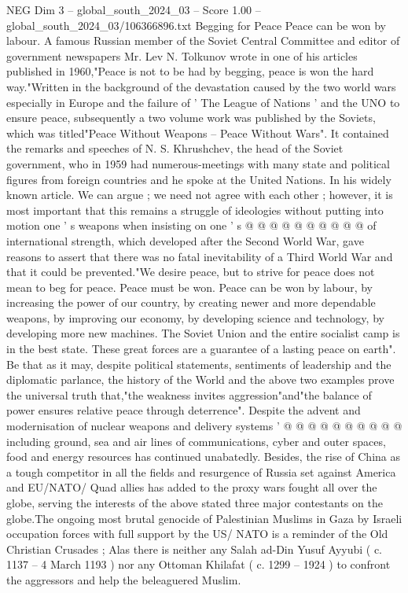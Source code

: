\begin{textsample}{NEG Dim 3 – global\_south\_2024\_03 – Score 1.00 – global\_south\_2024\_03/106366896.txt}  \label{ex:f3_neg_037}
Begging for Peace Peace can be won by labour.
A famous Russian member of the Soviet Central Committee and editor of government newspapers Mr.
Lev N.
Tolkunov wrote in one of his articles published in 1960,"Peace is not to be had by begging, peace is won the hard way."Written in the background of the devastation caused by the two world wars especially in Europe and the failure of ' The League of Nations ' and the UNO to ensure peace, subsequently a two volume work was published by the Soviets, which was titled"Peace Without Weapons -- Peace Without Wars".
It contained the remarks and speeches of N.
S.
Khrushchev, the head of the Soviet government, who in 1959 had numerous-meetings with many state and political figures from foreign countries and he spoke at the United Nations.
In his widely known article.
We can argue ; we need not agree with each other ; however, it is most important that this remains a struggle of ideologies without putting into motion one ' s weapons when insisting on one ' s @ @ @ @ @ @ @ @ @ @ of international strength, which developed after the Second World War, gave reasons to assert that there was no fatal inevitability of a Third World War and that it could be prevented."We desire peace, but to strive for peace does not mean to beg for peace.
Peace must be won.
Peace can be won by labour, by increasing the power of our country, by creating newer and more dependable weapons, by improving our economy, by developing science and technology, by developing more new machines.
The Soviet Union and the entire socialist camp is in the best state.
These great forces are a guarantee of a lasting peace on earth".
Be that as it may, despite political statements, sentiments of leadership and the diplomatic parlance, the history of the World and the above two examples prove the universal truth that,"the weakness invites aggression"and"the balance of power ensures relative peace through deterrence".
Despite the advent and modernisation of nuclear weapons and delivery systems ' @ @ @ @ @ @ @ @ @ @ including ground, sea and air lines of communications, cyber and outer spaces, food and energy resources has continued unabatedly.
Besides, the rise of China as a tough competitor in all the fields and resurgence of Russia set against America and EU/NATO/ Quad allies has added to the proxy wars fought all over the globe, serving the interests of the above stated three major contestants on the globe.The ongoing most brutal genocide of Palestinian Muslims in Gaza by Israeli occupation forces with full support by the US/ NATO is a reminder of the Old Christian Crusades ; Alas there is neither any Salah ad-Din Yusuf Ayyubi ( c. 1137 -- 4 March 1193 ) nor any Ottoman Khilafat ( c. 1299 -- 1924 ) to confront the aggressors and help the beleaguered Muslim.

\end{textsample}
